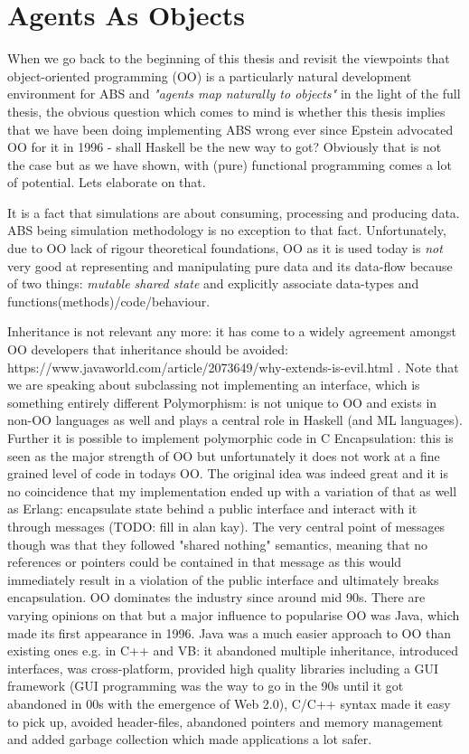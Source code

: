 \section{Agents As Objects}
When we go back to the beginning of this thesis and revisit the viewpoints that object-oriented programming (OO) is a particularly natural development environment for ABS \cite{epstein_growing_1996} and \textit{"agents map naturally to objects"} \cite{north_managing_2007} in the light of the full thesis, the obvious question which comes to mind is whether this thesis implies that we have been doing implementing ABS wrong ever since Epstein advocated OO for it in 1996 - shall Haskell be the new way to got? Obviously that is not the case but as we have shown, with (pure) functional programming comes a lot of potential. Lets elaborate on that.

\medskip

It is a fact that simulations are about consuming, processing and producing data. ABS being simulation methodology is no exception to that fact. Unfortunately, due to OO lack of rigour theoretical foundations, OO as it is used today is \textit{not} very good at representing and manipulating pure data and its data-flow because of two things: \textit{mutable shared state} and explicitly associate data-types and functions(methods)/code/behaviour.

Inheritance is not relevant any more: it has come to a widely agreement amongst OO developers that inheritance should be avoided: https://www.javaworld.com/article/2073649/why-extends-is-evil.html . Note that we are speaking about subclassing not implementing an interface, which is something entirely different
Polymorphism: is not unique to OO and exists in non-OO languages as well and plays a central role in Haskell (and ML languages). Further it is possible to implement polymorphic code in C
Encapsulation: this is seen as the major strength of OO but unfortunately it does not work at a fine grained level of code in todays OO. The original idea was indeed great and it is no coincidence that my implementation ended up with a variation of that as well as Erlang: encapsulate state behind a public interface and interact with it through messages (TODO: fill in alan kay). The very central point of messages though was that they followed "shared nothing" semantics, meaning that no references or pointers could be contained in that message as this would immediately result in a violation of the public interface and ultimately breaks encapsulation. 
OO dominates the industry since around mid 90s. There are varying opinions on that but a major influence to popularise OO was Java, which made its first appearance in 1996. Java was a much easier approach to OO than existing ones e.g. in C++ and VB: it abandoned multiple inheritance, introduced interfaces, was cross-platform, provided high quality libraries including a GUI framework (GUI programming was the way to go in the 90s until it got abandoned in 00s with the emergence of Web 2.0), C/C++ syntax made it easy to pick up, avoided header-files, abandoned pointers and memory management and added garbage collection which made applications a lot safer.


